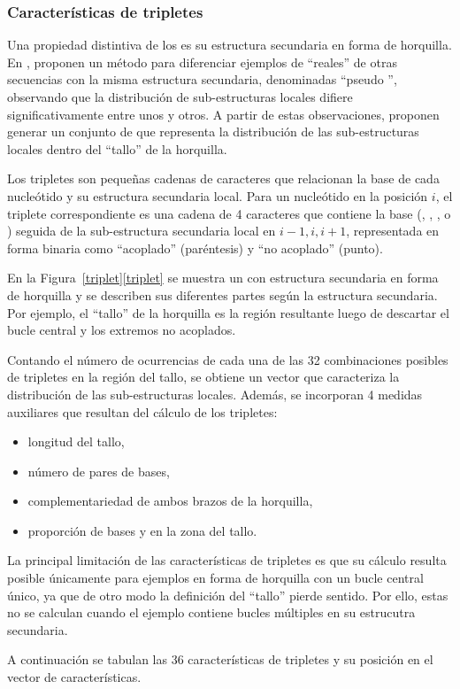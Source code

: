 %
%
\subsubsection{Características de tripletes}
%
Una propiedad distintiva de los  es su estructura
secundaria en forma de horquilla. En \cite{xue}, \citeauthor{xue}
proponen un método para diferenciar ejemplos de 
``reales'' de otras secuencias con la misma estructura secundaria,
denominadas ``pseudo '', observando que la distribución de
sub-estructuras locales difiere significativamente entre unos y otros.
A partir de estas observaciones, proponen generar un conjunto
de  que representa la distribución de las sub-estructuras
locales dentro del ``tallo'' de la horquilla.

Los tripletes son pequeñas cadenas de caracteres que relacionan la
base de cada nucleótido y su estructura secundaria local.  Para un
nucleótido en la posición $i$, el triplete correspondiente es una
cadena de 4 caracteres que contiene la base (\ntA, \ntC, \ntG, o \ntU)
seguida de la sub-estructura secundaria local en $i-1,i,i+1$,
representada en forma binaria como ``acoplado'' \pairL (paréntesis) y
``no acoplado'' \noPair (punto).

En la \iflatexml{}Figura~\ref{triplet}\else\autoref{triplet}\fi{} se
muestra un \premirna{} con estructura secundaria en forma de horquilla
y se describen sus diferentes partes según la estructura secundaria.
Por ejemplo, el ``tallo'' de la horquilla es la región resultante
luego de descartar el bucle central y los extremos no acoplados.

Contando el número de ocurrencias de cada una de las 32 combinaciones
posibles de tripletes en la región del tallo, se obtiene un vector que
caracteriza la distribución de las sub-estructuras locales.  Además,
se incorporan 4 medidas auxiliares que resultan del cálculo de los
tripletes:
%
\begin{itemize}
\item longitud del tallo,
\item número de pares de bases,
\item complementariedad de ambos brazos de la horquilla,
\item proporción de bases \ntG y \ntC en la zona del tallo.
\end{itemize}
%

La principal limitación de las características de tripletes es que su
cálculo resulta posible únicamente para ejemplos en forma de horquilla
con un bucle central único, ya que de otro modo la definición del
``tallo'' pierde sentido. Por ello, estas  no se calculan
cuando el ejemplo contiene bucles múltiples en su estrucutra secundaria.

A continuación se tabulan las 36 características de tripletes y su
posición en el vector de características.
